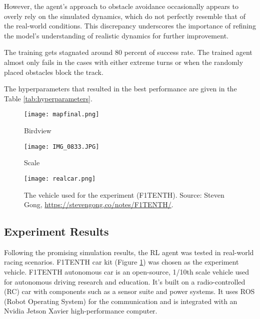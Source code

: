 \documentclass[a4paper, 10pt]{LTJournalArticle}
\begin{document}
However, the agent's approach to obstacle avoidance occasionally appears to overly rely on the simulated dynamics, which do not perfectly resemble that of the real-world conditions. This discrepancy underscores the importance of refining the model's understanding of realistic dynamics for further improvement.

The training gets stagnated around 80 percent of success rate. The trained agent almost only fails in the cases with either extreme turns or when the randomly placed obstacles block the track.

The hyperparameters that resulted in the best performance are given in the Table \ref{tab:hyperparameters}.



\begin{figure*}[t]
  \centering
  \begin{subfigure}[b]{0.49\textwidth}
    \texttt{[image: mapfinal.png]}
    \caption{Birdview}
  \end{subfigure}
  \hfill
  \begin{subfigure}[b]{0.49\textwidth}
    \texttt{[image: IMG\_0833.JPG]}
    \caption{Scale}
  \end{subfigure}
  \caption{The map used for experimental testing. (a) shows the birdview borders of the map. (b) shows the scale of a portion of the map. The map contains sharp turns and challenging features.}
  \label{fig:realmap}
\end{figure*}


\begin{figure}[!b] %
	\texttt{[image: realcar.png]}
	\caption{The vehicle used for the experiment (F1TENTH). Source: Steven Gong, \href{https://stevengong.co/notes/F1TENTH/}{https://stevengong.co/notes/F1TENTH/}.}
	\label{fig:realcar}
\end{figure}

\subsection{Experiment Results}
Following the promising simulation results, the RL agent was tested in real-world racing scenarios. F1TENTH car kit (Figure \ref{fig:realcar}) was chosen as the experiment vehicle. F1TENTH autonomous car is an open-source, 1/10th scale vehicle used for autonomous driving research and education. It's built on a radio-controlled (RC) car with components such as a sensor suite and power systems. It uses ROS (Robot Operating System) for the communication and is integrated with an Nvidia Jetson Xavier high-performance computer. 
\end{document}
